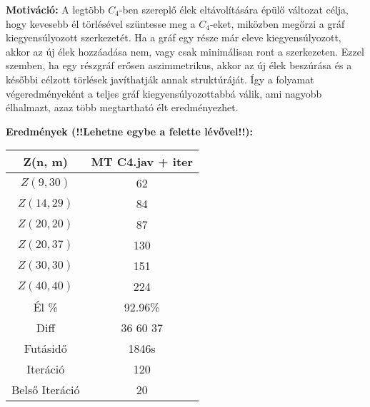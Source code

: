 \documentclass[12pt,a4paper]{article}
\begin{document}
\textbf{Motiváció:} A legtöbb $C_4$-ben szereplő élek eltávolítására épülő változat célja, hogy kevesebb él törlésével szüntesse meg a $C_4$-eket, miközben megőrzi a gráf kiegyensúlyozott szerkezetét. Ha a gráf egy része már eleve kiegyensúlyozott, akkor az új élek hozzáadása nem, vagy csak minimálisan ront a szerkezeten. Ezzel szemben, ha egy részgráf erősen aszimmetrikus, akkor az új élek beszúrása és a későbbi célzott törlések javíthatják annak struktúráját. Így a folyamat végeredményeként a teljes gráf kiegyensúlyozottabbá válik, ami nagyobb élhalmazt, azaz több megtartható élt eredményezhet.

\textbf{Eredmények (!!Lehetne egybe a felette lévővel!!):}
\begin{table}[H]
\centering
\begin{tabular}{|c|c|}
\hline
\textbf{Z(n, m)} & \textbf{MT C4.jav + iter} \\
\hline
$Z(9,30)$  & 62 \\
$Z(14, 29)$ & 84 \\
$Z(20, 20)$ & 87 \\
$Z(20, 37)$ & 130 \\
$Z(30, 30)$ & 151 \\
$Z(40, 40)$ & 224 \\
\hline
Él \% & 92.96\% \\
\hline
Diff & 36 60 37 \\
\hline
Futásidő & 1846s \\
Iteráció & 120 \\
Belső Iteráció & 20 \\
\hline
\end{tabular}
\end{table}
\end{document}
